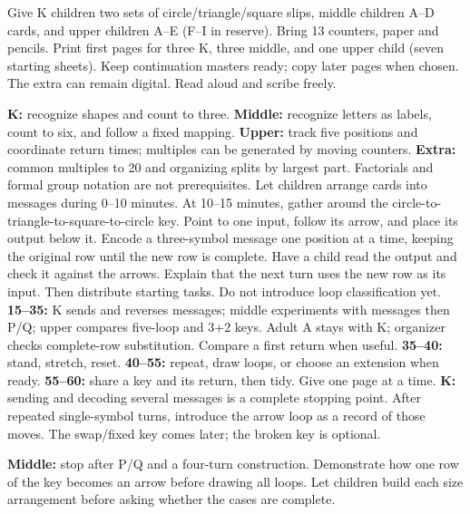 \documentclass[12pt]{extarticle}
\begin{document}
Give K children two sets of circle/triangle/square slips, middle children A--D cards, and upper children A--E (F--I in reserve). Bring 13 counters, paper and pencils. Print first pages for three K, three middle, and one upper child (seven starting sheets). Keep continuation masters ready; copy later pages when chosen. The extra can remain digital. Read aloud and scribe freely.\par
\textbf{K:} recognize shapes and count to three. \textbf{Middle:} recognize letters as labels, count to six, and follow a fixed mapping. \textbf{Upper:} track five positions and coordinate return times; multiples can be generated by moving counters. \textbf{Extra:} common multiples to 20 and organizing splits by largest part. Factorials and formal group notation are not prerequisites.
Let children arrange cards into messages during 0--10 minutes. At 10--15 minutes, gather around the circle-to-triangle-to-square-to-circle key. Point to one input, follow its arrow, and place its output below it. Encode a three-symbol message one position at a time, keeping the original row until the new row is complete. Have a child read the output and check it against the arrows. Explain that the next turn uses the new row as its input. Then distribute starting tasks. Do not introduce loop classification yet.
\textbf{15--35:} K sends and reverses messages; middle experiments with messages then P/Q; upper compares five-loop and 3+2 keys. Adult A stays with K; organizer checks complete-row substitution. Compare a first return when useful. \textbf{35--40:} stand, stretch, reset. \textbf{40--55:} repeat, draw loops, or choose an extension when ready. \textbf{55--60:} share a key and its return, then tidy. Give one page at a time.
\textbf{K:} sending and decoding several messages is a complete stopping point. After repeated single-symbol turns, introduce the arrow loop as a record of those moves. The swap/fixed key comes later; the broken key is optional.\par
\textbf{Middle:} stop after P/Q and a four-turn construction. Demonstrate how one row of the key becomes an arrow before drawing all loops. Let children build each size arrangement before asking whether the cases are complete.\par
\end{document}

